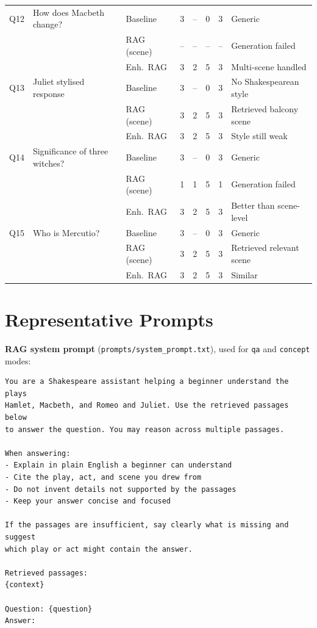 \begin{longtable}{@{}p{0.7cm} p{4.3cm} p{2.5cm} c c c c p{4.2cm}@{}}
\midrule
Q12 & How does Macbeth change? & Baseline   & 3 & -- & 0 & 3 & Generic \\
    &                          & RAG (scene)& -- & -- & -- & -- & Generation failed \\
    &                          & Enh.\ RAG  & 3 & 2  & 5 & 3 & Multi-scene handled \\
\midrule
Q13 & Juliet stylised response & Baseline   & 3 & -- & 0 & 3 & No Shakespearean style \\
    &                          & RAG (scene)& 3 & 2  & 5 & 3 & Retrieved balcony scene \\
    &                          & Enh.\ RAG  & 3 & 2  & 5 & 3 & Style still weak \\
\midrule
Q14 & Significance of three witches? & Baseline   & 3 & -- & 0 & 3 & Generic \\
    &                                & RAG (scene)& 1 & 1  & 5 & 1 & Generation failed \\
    &                                & Enh.\ RAG  & 3 & 2  & 5 & 3 & Better than scene-level \\
\midrule
Q15 & Who is Mercutio? & Baseline   & 3 & -- & 0 & 3 & Generic \\
    &                  & RAG (scene)& 3 & 2  & 5 & 3 & Retrieved relevant scene \\
    &                  & Enh.\ RAG  & 3 & 2  & 5 & 3 & Similar \\
\end{longtable}

\section{Representative Prompts}
\label{app:prompts}

\noindent\textbf{RAG system prompt} (\texttt{prompts/system\_prompt.txt}),
used for \texttt{qa} and \texttt{concept} modes:
\begin{lstlisting}
You are a Shakespeare assistant helping a beginner understand the plays
Hamlet, Macbeth, and Romeo and Juliet. Use the retrieved passages below
to answer the question. You may reason across multiple passages.

When answering:
- Explain in plain English a beginner can understand
- Cite the play, act, and scene you drew from
- Do not invent details not supported by the passages
- Keep your answer concise and focused

If the passages are insufficient, say clearly what is missing and suggest
which play or act might contain the answer.

Retrieved passages:
{context}

Question: {question}
Answer:
\end{lstlisting}

